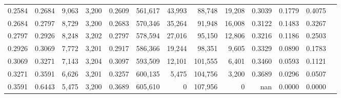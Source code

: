 \begin{tabular}{rrrrrrrrrrrrr}
0.2584 & 0.2684 &  9,063 & 3,200 &                                     0.2609 & 561,617 &  43,993 &  88,748 &  19,208 & 0.3039 & 0.1779 & 0.4075 \\
0.2684 & 0.2797 &  8,729 & 3,200 &                                     0.2683 & 570,346 &  35,264 &  91,948 &  16,008 & 0.3122 & 0.1483 & 0.3267 \\
0.2797 & 0.2926 &  8,248 & 3,202 &                                     0.2797 & 578,594 &  27,016 &  95,150 &  12,806 & 0.3216 & 0.1186 & 0.2503 \\
0.2926 & 0.3069 &  7,772 & 3,201 &                                     0.2917 & 586,366 &  19,244 &  98,351 &   9,605 & 0.3329 & 0.0890 & 0.1783 \\
0.3069 & 0.3271 &  7,143 & 3,204 &                                     0.3097 & 593,509 &  12,101 & 101,555 &   6,401 & 0.3460 & 0.0593 & 0.1121 \\
0.3271 & 0.3591 &  6,626 & 3,201 &                                     0.3257 & 600,135 &   5,475 & 104,756 &   3,200 & 0.3689 & 0.0296 & 0.0507 \\
0.3591 & 0.6443 &  5,475 & 3,200 &                                     0.3689 & 605,610 &       0 & 107,956 &       0 &    nan & 0.0000 & 0.0000 \\
\bottomrule
\end{tabular}

